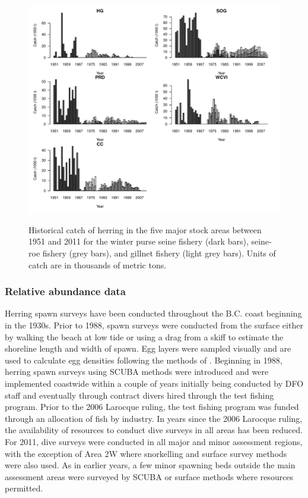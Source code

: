 \begin{figure}[!tbp]
	\includegraphics[width=\textwidth]{../Figs/iscam_fig_CatchMajorAreas.pdf}\\
	\caption{Historical catch of herring in the five major stock areas between 1951 and 2011 for the winter purse seine fishery (dark bars), seine-roe fishery (grey bars), and gillnet fishery (light grey bars). Units of catch are in thousands of metric tons.}\label{FigCatch}
\end{figure}
	
	\subsubsection{Relative abundance data}
Herring spawn surveys have been conducted throughout the B.C. coast beginning in the 1930s. Prior to 1988, spawn surveys were conducted from the surface either by walking the beach at low tide or using a drag from a skiff to estimate the shoreline length and width of spawn. Egg layers were sampled visually and are used to calculate egg densities following the methods of \cite{schweigert2001stock}. Beginning in 1988, herring spawn surveys using SCUBA methods were introduced and were implemented coastwide within a couple of years initially being conducted by DFO staff and eventually through contract divers hired through the test fishing program. Prior to the 2006 Larocque ruling, the test fishing program was funded through an allocation of fish by industry. In years since the 2006 Larocque ruling, the availability of resources to conduct dive surveys in all areas has been reduced. For 2011, dive surveys were conducted in all major and minor assessment regions, with the exception of Area 2W where snorkelling and surface survey methods were also used. As in earlier years, a few minor spawning beds outside the main assessment areas were surveyed by SCUBA or surface methods where resources permitted.


